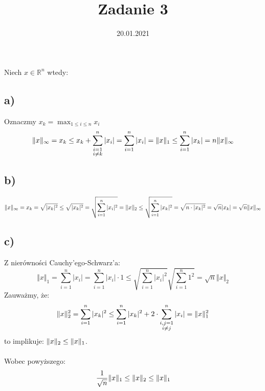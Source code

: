 \documentclass{article}
\title{Zadanie 3}
\date{20.01.2021}
\DeclarePairedDelimiter{\norm}{\lVert}{\rVert}
\begin{document}
\maketitle
Niech $x \in \mathbb{R}^n$ wtedy:
\subsection*{a)}
Oznaczmy $x_k = \max_{1\leq i \leq n}{x_i}$
$$
\norm{x}_\infty = x_k \leq x_k + \sum\limits_{\substack{i = 1 \\ i\neq k}}^n |x_i| = \sum_{i=1}^{n} |x_i| = \norm{x}_1 \leq  \sum_{i=1}^{n} |x_k| = n\norm{x}_\infty
$$
\subsection*{b)}
$$
\norm{x}_\infty = x_k = \sqrt{|x_k|^2} \leq \sqrt{|x_k|^2} = \sqrt{\sum_{i=1}^{n} |x_i|^2} = \norm{x}_2 \leq \sqrt{\sum_{i=1}^{n} |x_k|^2} = \sqrt{n\cdot|x_k|^2} =\sqrt{n}|x_k| = \sqrt{n}\norm{x}_\infty
$$
\subsection*{c)}
Z nierówności Cauchy'ego-Schwarz'a:
$$
\Vert x\Vert_1=
\sum\limits_{i=1}^n|x_i|=
\sum\limits_{i=1}^n|x_i|\cdot 1\leq
\sqrt{\sum\limits_{i=1}^n|x_i|^2}\sqrt{\sum\limits_{i=1}^n 1^2}=
\sqrt{n}\Vert x\Vert_2
$$
Zauważmy, że:
$$
\norm{x}_2^2 = \sum_{i=1}^{n} |x_k|^2 \leq \sum_{i=1}^{n} |x_k|^2 + 2 \cdot \sum\limits_{\substack{i,j= 1 \\ i\neq j}}^n |x_i| = \norm{x}_1^2
$$
to implikuje: $\norm{x}_2 \leq \norm{x}_1$.\\\\
Wobec powyższego:
$$
\frac{1}{\sqrt{n}} \norm{x}_1  \leq\norm{x}_2 \leq \norm{x}_1
$$
\end{document}
